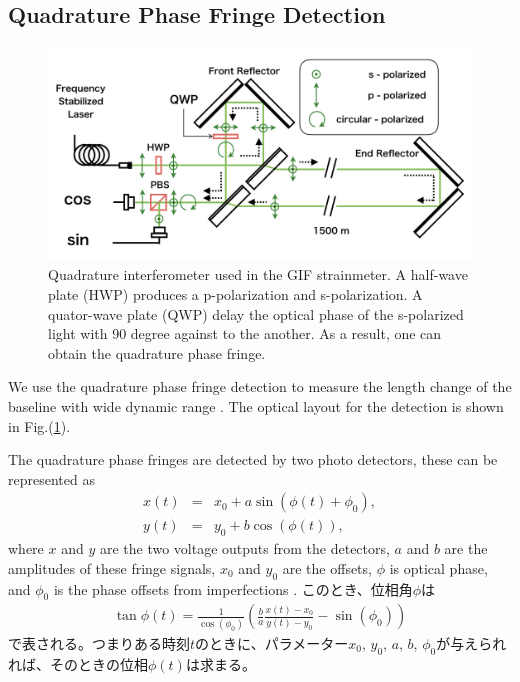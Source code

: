 \subsection{Quadrature Phase Fringe Detection}
\begin{figure}[h]
  \begin{center}
    \includegraphics[width=13.0cm]{./img_chap4/img413.png}
    \caption{Quadrature interferometer used in the GIF strainmeter. A half-wave plate (HWP) produces a p-polarization and s-polarization. A quator-wave plate (QWP) delay the optical phase of the s-polarized light with 90 degree against to the another. As a result, one can obtain the quadrature phase fringe.}\label{img:img413}
  \end{center}
\end{figure}

We use the quadrature phase fringe detection to measure the length change of the baseline with wide dynamic range \cite{bobroff1993recent}. The optical layout for the detection is shown in Fig.(\ref{img:img413}).

The quadrature phase fringes are detected by two photo detectors, these can be represented as
\begin{eqnarray}
  x(t) &=& x_0 + a \sin(\phi(t)+\phi_0), \\
  y(t) &=& y_0 + b \cos(\phi(t)),
\end{eqnarray}
where $x$ and $y$ are the two voltage outputs from the detectors, $a$ and $b$ are the amplitudes of these fringe signals, $x_0$ and $y_0$ are the offsets, $\phi$ is optical phase, and $\phi_0$ is the phase offsets from imperfections \cite{zumberge2004resolving}.
このとき、位相角$\phi$は
\begin{eqnarray}
  \tan{\phi(t)} = \frac{1}{{\cos(\phi_0)}} \left(\displaystyle{\frac{b}{a}\frac{x(t)-x_0}{y(t)-y_0}-\sin(\phi_0)}\right)
\end{eqnarray}
で表される。つまりある時刻$t$のときに、パラメーター$x_0,\,y_0,\,a,\,b,\,\phi_0$が与えられれば、そのときの位相$\phi(t)$は求まる。

